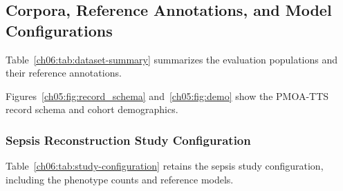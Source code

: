 
\subsection{Corpora, Reference Annotations, and Model Configurations}\label{ch05:apd:corpora-configurations}

Table~\ref{ch06:tab:dataset-summary} summarizes the evaluation populations and their reference annotations.

Figures~\ref{ch05:fig:record_schema} and~\ref{ch05:fig:demo} show the PMOA-TTS record schema and cohort demographics.



\FloatBarrier





\FloatBarrier





\subsubsection{Sepsis Reconstruction Study Configuration}

Table~\ref{ch06:tab:study-configuration} retains the sepsis study configuration, including the phenotype counts and reference models.



\FloatBarrier
